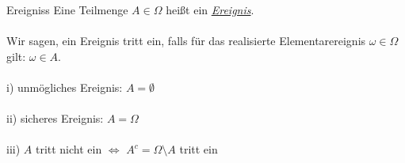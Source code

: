 \documentclass[avery5388,grid,frame]{flashcards}
\begin{document}

\begin{flashcard}[Definition]{Ereigniss}
  Eine Teilmenge $A \in \Omega$ heißt ein \underline{\textit{Ereignis}}.\\\\
Wir sagen, ein Ereignis tritt ein, falls für das realisierte Elementarereignis $\omega \in \Omega$ gilt: $\omega \in A$.\\\\
i) unmögliches Ereignis: $A=\emptyset$\\\\
ii) sicheres Ereignis: $A=\Omega$\\\\
iii) $A$ tritt nicht ein $\Leftrightarrow$ $A^c=\Omega\setminus A$ tritt ein \\\\
\end{flashcard}
\end{document}

